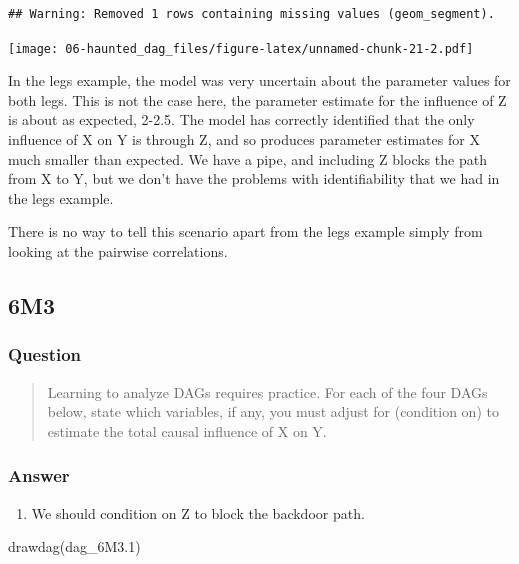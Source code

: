 \documentclass[
]{book}
\newenvironment{Shaded}{\begin{snugshade}}{\end{snugshade}}
\newcommand{\FloatTok}[1]{\textcolor[rgb]{0.00,0.00,0.81}{#1}}
\newcommand{\FunctionTok}[1]{\textcolor[rgb]{0.00,0.00,0.00}{#1}}
\newcommand{\NormalTok}[1]{#1}
\providecommand{\tightlist}{%
  \setlength{\itemsep}{0pt}\setlength{\parskip}{0pt}}
\begin{document}
\begin{verbatim}
## Warning: Removed 1 rows containing missing values (geom_segment).
\end{verbatim}

\texttt{[image: 06-haunted\_dag\_files/figure-latex/unnamed-chunk-21-2.pdf]}

In the legs example, the model was very uncertain about the parameter values for both legs. This is not the case here, the parameter estimate for the influence of Z is about as expected, 2-2.5. The model has correctly identified that the only influence of X on Y is through Z, and so produces parameter estimates for X much smaller than expected. We have a pipe, and including Z blocks the path from X to Y, but we don't have the problems with identifiability that we had in the legs example.

There is no way to tell this scenario apart from the legs example simply from looking at the pairwise correlations.

\hypertarget{m3-3}{%
\subsection*{6M3}\label{m3-3}}

\hypertarget{question-54}{%
\subsubsection*{Question}\label{question-54}}

\begin{quote}
Learning to analyze DAGs requires practice. For each of the four DAGs below, state which variables, if any, you must adjust for (condition on) to estimate the total causal influence of X on Y.
\end{quote}

\hypertarget{answer-54}{%
\subsubsection*{Answer}\label{answer-54}}

\begin{enumerate}
\def\labelenumi{\arabic{enumi}.}
\tightlist
\item
  We should condition on Z to block the backdoor path.
\end{enumerate}

\begin{Shaded}
\begin{Highlighting}[]
\FunctionTok{drawdag}\NormalTok{(dag\_6M3}\FloatTok{.1}\NormalTok{)}
\end{Highlighting}
\end{Shaded}
\end{document}
